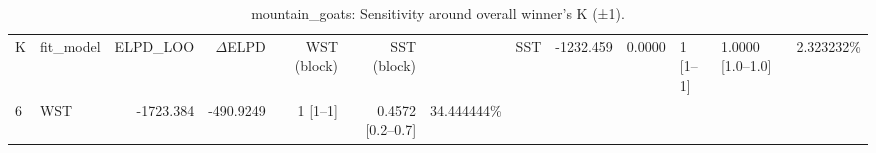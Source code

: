 \begin{table}[!h]
\centering
\caption{mountain_goats: Sensitivity around overall winner's K (±1).\\\label{tab:app-mountain_goats-C-sensitivity}}
\centering
\begin{tabular}[t]{llrrrrr}
\toprule
K & fit_model & ELPD\_LOO & $\Delta$ELPD & WST (block) & SST (block) & %
 & SST & -1232.459 & 0.0000 & 1 [1--1] & 1.0000 [1.0--1.0] & 2.323232\%\\
6 & WST & -1723.384 & -490.9249 & 1 [1--1] & 0.4572 [0.2--0.7] & 34.444444\%\\
\bottomrule
\end{tabular}
\end{table}
